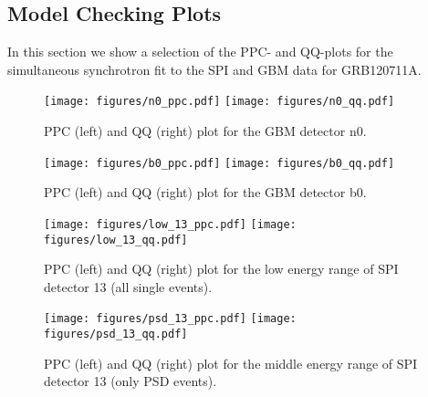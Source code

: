 \documentclass[twocolumn]{aa}
\begin{document}
\begin{appendix}
  \section{Model Checking Plots}
  \label{appendix1}
  In this section we show a selection of the PPC- and QQ-plots for the simultaneous synchrotron fit to the SPI and GBM data for GRB120711A.
  \begin{figure}[H]
    \begin{centering}
      \texttt{[image: figures/n0\_ppc.pdf]}
      \texttt{[image: figures/n0\_qq.pdf]}
      \caption{PPC (left) and QQ (right) plot for the GBM detector n0.}
      \label{fig:n0_model_check}
    \end{centering}
  \end{figure}
  \begin{figure}[H]
    \begin{centering}
      \texttt{[image: figures/b0\_ppc.pdf]}
      \texttt{[image: figures/b0\_qq.pdf]}
      \caption{PPC (left) and QQ (right) plot for the GBM detector b0.}
      \label{fig:b0_model_check}
    \end{centering}
  \end{figure}
  \begin{figure}[H]
    \begin{centering}
      \texttt{[image: figures/low\_13\_ppc.pdf]}
      \texttt{[image: figures/low\_13\_qq.pdf]}
      \caption{PPC (left) and QQ (right) plot for the low energy range of SPI detector 13 (all single events).}
      \label{fig:low_13_model_check}
    \end{centering}
  \end{figure}
  \begin{figure}[H]
    \begin{centering}
      \texttt{[image: figures/psd\_13\_ppc.pdf]}
      \texttt{[image: figures/psd\_13\_qq.pdf]}
      \caption{PPC (left) and QQ (right) plot for the middle energy range of SPI detector 13 (only PSD events).}
      \label{fig:psd_13_model_check}
    \end{centering}
  \end{figure}
\end{appendix}



\end{document}
